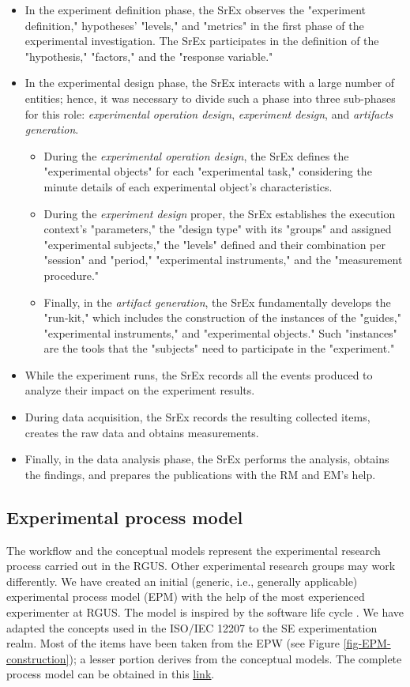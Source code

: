 \begin{itemize}
	\item In the experiment definition phase, the SrEx observes the "experiment definition," hypotheses' "levels," and "metrics" in the first phase of the experimental investigation. The SrEx participates in the definition of the "hypothesis," "factors," and the "response variable."
	\item In the experimental design phase, the SrEx interacts with a large number of entities; hence, it was necessary to divide such a phase into three sub-phases for this role: \textit{experimental operation design}, \textit{experiment design}, and \textit{artifacts generation}.
    \begin{itemize}
	    \item During the \textit{experimental operation design}, the SrEx defines the "experimental objects" for each "experimental task," considering the minute details of each experimental object's characteristics.
	    \item During the \textit{experiment design} proper, the SrEx establishes the execution context's "parameters," the "design type" with its "groups" and assigned "experimental subjects," the "levels" defined and their combination per "session" and "period," "experimental instruments," and the "measurement procedure." 
        \item Finally, in the \textit{artifact generation}, the SrEx fundamentally develops the "run-kit," which includes the construction of the instances of the "guides," "experimental instruments," and "experimental objects." Such "instances" are the tools that the "subjects" need to participate in the "experiment."
	\end{itemize}
	\item While the experiment runs, the SrEx records all the events produced to analyze their impact on the experiment results.
	\item During data acquisition, the SrEx records the resulting collected items, creates the raw data and obtains measurements.
	\item Finally, in the data analysis phase, the SrEx performs the analysis, obtains the findings, and prepares the publications with the RM and EM's help.
\end{itemize}

\subsection{Experimental process model}
The workflow and the conceptual models represent the experimental research process carried out in the RGUS. Other experimental research groups may work differently. We have created an initial (generic, i.e., generally applicable) experimental process model (EPM) with the help of the most experienced experimenter at RGUS. The model is inspired by the software life cycle \cite{ISO-IEC-IEEE-12207}. We have adapted the concepts used in the ISO/IEC 12207 to the SE experimentation realm. Most of the items have been taken from the EPW (see Figure \ref{fig-EPM-construction}); a lesser portion derives from the conceptual models. The complete process model can be obtained in this \href{https://zenodo.org/record/7105096#.YyxoCOzMLUI}{\ul{link}}.

